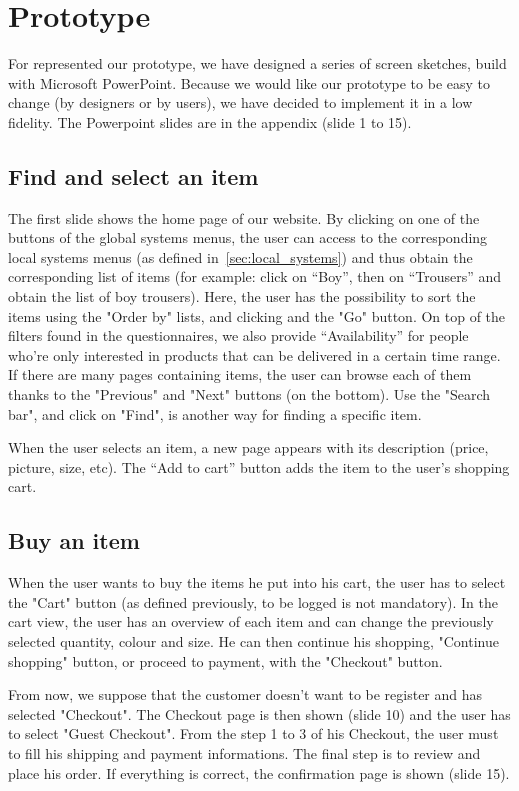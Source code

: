 \section{Prototype}

For represented our prototype, we have designed a series of screen sketches, build with Microsoft PowerPoint. Because we would like our prototype to be easy to change (by designers or by users),
we have decided to implement it in a low fidelity. The Powerpoint slides are in the appendix (slide 1 to 15).

\subsection{Find and select an item}
The first slide shows the home page of our website. By clicking on one of the buttons of the global systems menus, the user can access to the corresponding local systems menus (as defined in~\ref{sec:local_systems}) and thus obtain the corresponding list of items (for example: click on ``Boy'', then on ``Trousers'' and obtain the list of boy trousers). Here, the user has the possibility to sort the items using the "Order by" lists, and clicking and the "Go" button. On top of the filters found in the questionnaires, we also provide ``Availability'' for people who're only interested in products that can be delivered in a certain time range. If there are many pages containing items, the user can browse each of them thanks to the "Previous" and "Next" buttons (on the bottom). Use the "Search bar", and click on "Find", is another way for finding a specific item.

When the user selects an item, a new page appears with its description (price, picture, size, etc). 
The ``Add to cart'' button adds the item to the user's shopping cart.

\subsection{Buy an item}
When the user wants to buy the items he put into his cart, the user has to select the "Cart" button (as defined previously, to be logged is not mandatory). In the cart view, the user has an overview of each item and can change the previously selected quantity, colour and size. He can then continue his shopping, "Continue shopping" button, or proceed to payment, with the "Checkout" button.

From now, we suppose that the customer doesn't want to be register and has selected "Checkout". The Checkout page is then shown (slide 10) and the user has to select "Guest Checkout". From the step 1 to 3 of his Checkout, the user must to fill his shipping and payment informations. The final step is to review and place his order. If everything is correct, the confirmation page is shown (slide 15).
